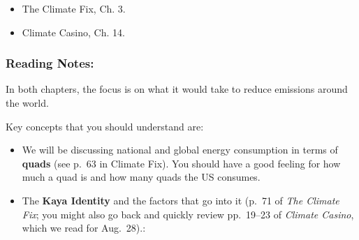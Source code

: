 \documentclass[
]{article}
\providecommand{\tightlist}{%
  \setlength{\itemsep}{0pt}\setlength{\parskip}{0pt}}
\newcommand{\COO}{\ce{CO2}}
\begin{document}
\begin{itemize}
\tightlist
\item
  The Climate Fix, Ch. 3.
\item
  Climate Casino, Ch. 14.
\end{itemize}

\hypertarget{reading-notes-18}{%
\subsubsection{Reading Notes:}\label{reading-notes-18}}

In both chapters, the focus is on what it would take to reduce
\COO emissions around the world.

Key concepts that you should understand are:

\begin{itemize}
\item
  We will be discussing national and global energy consumption in terms
  of \textbf{quads} (see p.~63 in Climate Fix). You should have a good
  feeling for how much a quad is and how many quads the US consumes.
\item
  The \textbf{Kaya Identity} and the factors that go into it (p.~71 of
  \emph{The Climate Fix}; you might also go back and quickly review
  pp.~19--23 of \emph{Climate Casino}, which we read for Aug.~28).:


\end{itemize}
\end{document}
